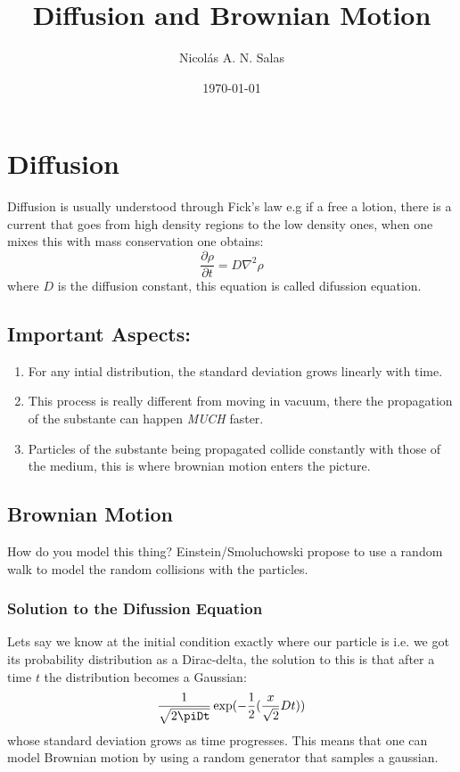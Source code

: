 \documentclass[11pt]{article}
\author{Nicolás A. N. Salas}
\date{\today}
\title{Diffusion and Brownian Motion}
\begin{document}
\maketitle
\tableofcontents


\section{Diffusion}
\label{sec:org30879c8}
Diffusion is usually understood through Fick's law e.g if a free a lotion, there is a current that goes from high density regions to the low density ones, when one mixes this with mass conservation one obtains:
$$\frac{\partial \rho}{\partial t}=D\nabla^2\rho$$
where \(D\) is the diffusion constant, this equation is called difussion equation.
\subsection{Important Aspects:}
\label{sec:org212218c}
\begin{enumerate}
\item For any intial distribution, the standard deviation grows linearly with time.
\item This process is really different from moving in vacuum, there the propagation of the substante can happen \emph{MUCH} faster.
\item Particles of the substante being propagated collide constantly with those of the medium, this is where brownian motion enters the picture.
\end{enumerate}

\subsection{Brownian Motion}
\label{sec:org76ef5e1}
How do you model this thing? Einstein/Smoluchowski propose to use a random walk to model the random collisions with the particles.
\subsubsection{Solution to the Difussion Equation}
\label{sec:org522164b}
Lets say we know at the initial condition exactly where our particle is i.e. we got its probability distribution as a Dirac-delta, the solution to this is that after a time \(t\) the distribution becomes a Gaussian:
$$\frac{1}{\sqrt{2\piDt}}\exp(-\frac{1}{2}(\frac{x}{\sqrt{2}}Dt))$$
whose standard deviation grows as time progresses. This means that one can model Brownian motion by using a random generator that samples a gaussian.
\end{document}
